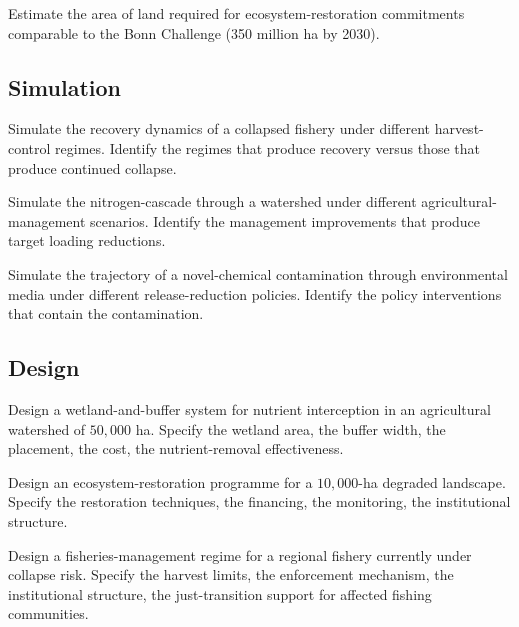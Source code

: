 \begin{exercise}
Estimate the area of land required for ecosystem-restoration commitments comparable to the Bonn Challenge (350 million ha by 2030).
\end{exercise}

\subsection*{Simulation}

\begin{exercise}
Simulate the recovery dynamics of a collapsed fishery under different harvest-control regimes. Identify the regimes that produce recovery versus those that produce continued collapse.
\end{exercise}

\begin{exercise}
Simulate the nitrogen-cascade through a watershed under different agricultural-management scenarios. Identify the management improvements that produce target loading reductions.
\end{exercise}

\begin{exercise}
Simulate the trajectory of a novel-chemical contamination through environmental media under different release-reduction policies. Identify the policy interventions that contain the contamination.
\end{exercise}

\subsection*{Design}

\begin{exercise}
Design a wetland-and-buffer system for nutrient interception in an agricultural watershed of $50{,}000$ ha. Specify the wetland area, the buffer width, the placement, the cost, the nutrient-removal effectiveness.
\end{exercise}

\begin{exercise}
Design an ecosystem-restoration programme for a $10{,}000$-ha degraded landscape. Specify the restoration techniques, the financing, the monitoring, the institutional structure.
\end{exercise}

\begin{exercise}
Design a fisheries-management regime for a regional fishery currently under collapse risk. Specify the harvest limits, the enforcement mechanism, the institutional structure, the just-transition support for affected fishing communities.
\end{exercise}

